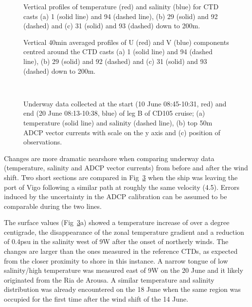 \begin{figure}[!p]
\centering {}%
\caption{Vertical profiles of temperature (red) and salinity
(blue) for CTD casts (a) 1 (solid line) and 94 (dashed line), (b)
29 (solid) and 92 (dashed) and (c) 31 (solid) and 93 (dashed) down
to 200m.} \label{fig:refctd}\end{figure}
\begin{figure}[!p]
\centering {}%
\caption{Vertical 40min averaged profiles of U (red) and V (blue)
components centred around the CTD casts (a) 1 (solid line) and 94
(dashed line), (b) 29 (solid) and 92 (dashed) and (c) 31 (solid)
and 93 (dashed) down to 200m.} \label{fig:refadcp}\end{figure}

\begin{figure}[!t]
\centering {}\\
\caption{Underway data collected at the start (10 June
08:45-10:31, red) and end (20 June 08:13-10:38, blue) of leg B of
CD105 cruise;  (a) temperature (solid line) and salinity (dashed
line), (b) top 50m ADCP vector currents with scale on the y axis
and (c) position of observations.} \label{fig:refths}\end{figure}

Changes are more dramatic nearshore when comparing underway data
(temperature, salinity and ADCP vector currents) from before and
after the wind shift. Two short sections are compared in
Fig~\ref{fig:refths} when the ship was leaving the port of Vigo
following a similar path at roughly the same velocity (4.5\vel).
Errors induced by the uncertainty in the ADCP calibration can be
assumed to be comparable during the two lines.

The surface values (Fig~\ref{fig:refths}a) showed a temperature
increase of over a degree centigrade, the disappearance of the
zonal temperature gradient and a reduction of 0.4psu in the
salinity west of 9\deg W after the onset of northerly winds. The
changes are larger than the ones measured in the reference CTDs,
as expected from the closer proximity to shore in this instance. A
narrow tongue of low salinity/high temperature was measured east
of 9\deg W on the 20 June and it likely originated from the Ria de
Arousa. A similar temperature and salinity distribution was
already encountered on the 18 June when the same region was
occupied for the first time after the wind shift of the 14 June.

